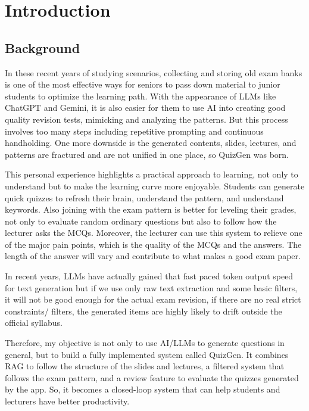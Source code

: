 \documentclass[12pt,a4paper]{article}
\begin{document}

\newpage
{}
\setcounter{page}{1}
\section{Introduction}

\subsection{Background}

In these recent years of studying scenarios, collecting and storing old exam
banks is one of the most effective ways for seniors to pass down material to
junior students to optimize the learning path. With the appearance of LLMs
like ChatGPT and Gemini, it is also easier for them to use AI into creating
good quality revision tests, mimicking and analyzing the patterns. But this
process involves too many steps including repetitive prompting and continuous
handholding. One more downside is the generated contents, slides, lectures,
and patterns are fractured and are not unified in one place, so QuizGen was
born.

This personal experience highlights a practical approach to learning, not
only to understand but to make the learning curve more enjoyable. Students
can generate quick quizzes to refresh their brain, understand the pattern,
and understand keywords. Also joining with the exam pattern is better for
leveling their grades, not only to evaluate random ordinary questions but
also to follow how the lecturer asks the MCQs. Moreover, the lecturer can
use this system to relieve one of the major pain points, which is the quality
of the MCQs and the answers. The length of the answer will vary and
contribute to what makes a good exam paper.

In recent years, LLMs have actually gained that fast paced token output speed for text generation but if we use only raw text extraction and some basic filters, it will not be good enough for the actual exam revision, if there are no real strict constraints/ filters, the generated items are highly likely to drift outside the official syllabus.

Therefore, my objective is not only to use AI/LLMs to generate questions in
general, but to build a fully implemented system called QuizGen. It combines
RAG to follow the structure of the slides and lectures, a filtered system
that follows the exam pattern, and a review feature to evaluate the quizzes
generated by the app. So, it becomes a closed-loop system that can help
students and lecturers have better productivity.
\end{document}
